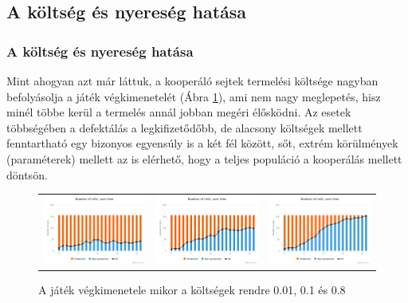 \subsection{A költség és nyereség hatása}
\begin{frame}
\frametitle{A költség és nyereség hatása}
Mint ahogyan azt már láttuk, a kooperáló sejtek termelési költsége nagyban befolyásolja a játék végkimenetelét (Ábra \ref{fig:CoopCostChange}), ami nem nagy meglepetés, hisz minél többe kerül a termelés annál jobban megéri élősködni. Az esetek többségében a defektálás a legkifizetődőbb, de alacsony költségek mellett fenntartható egy bizonyos egyensúly is a két fél között, sőt, extrém körülmények (paraméterek) mellett az is elérhető, hogy a teljes populáció a kooperálás mellett döntsön.

\begin{figure}[h]
	\centering
	\begin{tabular}{ccc}
		\includegraphics[width=0.32\linewidth]{images/chart001.jpeg}
		&
		\includegraphics[width=0.32\linewidth]{images/chart01.jpeg}
		&
		\includegraphics[width=0.32\linewidth]{images/chart08.jpeg}
	\end{tabular}
	\caption{A játék végkimenetele mikor a költségek rendre 0.01, 0.1 és 0.8\label{fig:CoopCostChange}}
\end{figure}
\end{frame}

